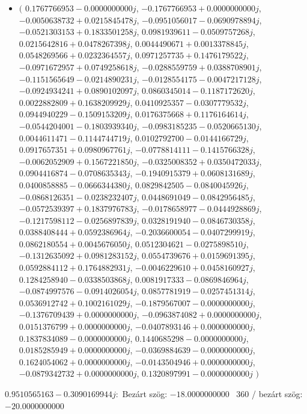 \documentclass[14pt,a4paper]{article}
\begin{document}
\begin{itemize}
\item
$\big($
$0.1767766953-0.0000000000j$, $-0.1767766953+0.0000000000j$, $-0.0050638732+0.0215845478j$, $-0.0951056017-0.0690978894j$, $-0.0521303153+0.1833501258j$, $0.0981939611-0.0509757268j$, $0.0215642816+0.0478267398j$, $0.0044490671+0.0013378845j$, $0.0548269566+0.0232364557j$, $0.0971257735+0.1476179522j$, $-0.0971672957+0.0749258618j$, $-0.0288559759+0.0388708901j$, $-0.1151565649-0.0214890231j$, $-0.0128554175-0.0047217128j$, $-0.0924934241+0.0890102097j$, $0.0860345014-0.1187172620j$, $0.0022882809+0.1638209929j$, $0.0410925357-0.0307779532j$, $0.0944940229-0.1509153209j$, $0.0176375668+0.1176164614j$, $-0.0544204001-0.1803939340j$, $-0.0983185235-0.0520665130j$, $0.0044611471-0.1144744719j$, $0.0102792700-0.0144166729j$, $0.0917657351+0.0980967761j$, $-0.0778814111-0.1415766328j$, $-0.0062052909+0.1567221850j$, $-0.0325008352+0.0350472033j$, $0.0904416874-0.0708635343j$, $-0.1940915379+0.0608131689j$, $0.0400858885-0.0666344380j$, $0.0829842505-0.0840045926j$, $-0.0868126351-0.0238232407j$, $0.0448691049-0.0842956485j$, $-0.0572539397+0.1837976783j$, $-0.0178658977-0.0444928869j$, $-0.1217598112-0.0256897839j$, $0.0328191940-0.0846730358j$, $0.0388408444+0.0592386964j$, $-0.2036600054-0.0407299919j$, $0.0862180554+0.0045676050j$, $0.0512304621-0.0275898510j$, $-0.1312635092+0.0981283152j$, $0.0554739676+0.0159691395j$, $0.0592884112+0.1764882931j$, $-0.0046229610+0.0458160927j$, $0.1284258940-0.0338503868j$, $0.0081917333-0.0869846964j$, $-0.0874997576-0.0914026054j$, $0.0857781919-0.0257451314j$, $0.0536912742+0.1002161029j$, $-0.1879567007-0.0000000000j$, $-0.1376709439+0.0000000000j$, $-0.0963874082+0.0000000000j$, $0.0151376799+0.0000000000j$, $-0.0407893146+0.0000000000j$, $0.1837834089-0.0000000000j$, $0.1440685298-0.0000000000j$, $0.0185285949+0.0000000000j$, $-0.0369884639-0.0000000000j$, $0.1624054062+0.0000000000j$, $-0.0143504946+0.0000000000j$, $-0.0879342732+0.0000000000j$, $0.1320897991-0.0000000000j$
$\big)$
\end{itemize}
$0.9510565163-0.3090169944j$:\
Bezárt szög: $-18.0000000000$ \
360 / bezárt szög: $-20.0000000000$\
\end{document}
